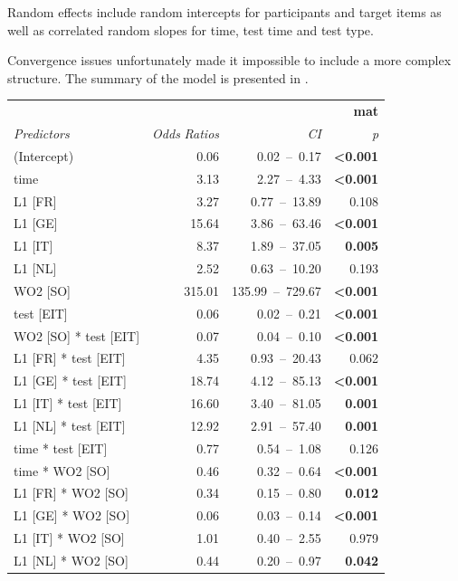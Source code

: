 Random effects include random intercepts for participants and target items as well as correlated random slopes for time, test time and test type. 

Convergence issues unfortunately made it impossible to include a more complex structure. The summary of the model is presented in .

\begin{table}
    \begin{tabularx}{\textwidth}{lrrr}
    \lsptoprule
    \textbf{~} & \multicolumn{3}{X}{ \textbf{mat}}\\
    \textit{Predictors} & \textit{Odds} \textit{Ratios} & \textit{CI} & \textit{p}\\
    \midrule
    (Intercept) & 0.06 & 0.02~–~0.17 & \textbf{<0.001}\\
    time & 3.13 & 2.27~–~4.33 & \textbf{<0.001}\\
    L1 [FR] & 3.27 & 0.77~–~13.89 & 0.108\\
    L1 [GE] & 15.64 & 3.86~–~63.46 & \textbf{<0.001}\\
    L1 [IT] & 8.37 & 1.89~–~37.05 & \textbf{0.005}\\
    L1 [NL] & 2.52 & 0.63~–~10.20 & 0.193\\
    WO2 [SO] & 315.01 & 135.99~–~729.67 & \textbf{<0.001}\\
    test [EIT] & 0.06 & 0.02~–~0.21 & \textbf{<0.001}\\
    WO2 [SO] * test [EIT] & 0.07 & 0.04~–~0.10 & \textbf{<0.001}\\
    L1 [FR] * test [EIT] & 4.35 & 0.93~–~20.43 & 0.062\\
    L1 [GE] * test [EIT] & 18.74 & 4.12~–~85.13 & \textbf{<0.001}\\
    L1 [IT] * test [EIT] & 16.60 & 3.40~–~81.05 & \textbf{0.001}\\
    L1 [NL] * test [EIT] & 12.92 & 2.91~–~57.40 & \textbf{0.001}\\
    time * test [EIT] & 0.77 & 0.54~–~1.08 & 0.126\\
    time * WO2 [SO] & 0.46 & 0.32~–~0.64 & \textbf{<0.001}\\
    L1 [FR] * WO2 [SO] & 0.34 & 0.15~–~0.80 & \textbf{0.012}\\
    L1 [GE] * WO2 [SO] & 0.06 & 0.03~–~0.14 & \textbf{<0.001}\\
    L1 [IT] * WO2 [SO] & 1.01 & 0.40~–~2.55 & 0.979\\
    L1 [NL] * WO2 [SO] & 0.44 & 0.20~–~0.97 & \textbf{0.042}\\

\end{tabularx}
\end{table}
